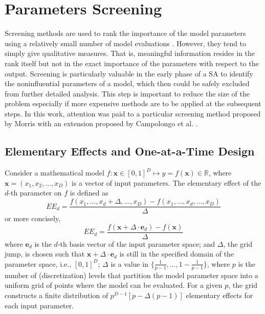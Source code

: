\section{Parameters Screening}\label{sec:sa_parameters_screening}

Screening methods are used to rank the importance of the model parameters using a relatively small number of model evaluations \cite{Saltelli2004}.
However, they tend to simply give qualitative measures.
That is, meaningful information resides in the rank itself but not in the exact importance of the parameters with respect to the output. 
Screening is particularly valuable in the early phase of a SA to identify the noninfluential parameters of a model,
which then could be safely excluded from further detailed analysis. 
This step is important to reduce the size of the problem especially if more expensive methods are to be applied at the subsequent steps. 
In this work, attention was paid to a particular screening method proposed by Morris \cite{Morris1991} with an extension proposed by Campolongo et al. \cite{Campolongo2011}.

\subsection{Elementary Effects and One-at-a-Time Design}\label{sub:sa_ee_oat}

Consider a mathematical model $f: \bm{x} \in [0,1]^D \mapsto y = f(\bm{x}) \in \mathbb{R}$, 
where $\bm{x} = (x_1, x_2, \dots,x_D)$ is a vector of input parameters.
The elementary effect of the $d$-th parameter on $f$ is defined as
\begin{equation}
  EE_d = \frac{f(x_1, \dots, x_d+\Delta,\dots,x_D) - f(x_1, \dots, x_d,\dots,x_D)}{\Delta}
\label{eq:elementary_effect}
\end{equation}
or more concisely,
\begin{equation}
  EE_d = \frac{f(\bm{x} + \Delta \cdot \bm{e}_d) - f(\bm{x})}{\Delta}
\label{eq:elementary_effect_concise}
\end{equation}
where $\bm{e}_d$ is the $d$-th basis vector of the input parameter space;
and $\Delta$, the grid jump, is chosen such that $\mathbf{x} + \Delta \cdot \bm{e}_d$ is still in the specified domain of the parameter space, i.e., $[0,1]^D$; 
$\Delta$ is a value in $\{\frac{1}{p-1}, \dots, 1 - \frac{1}{p-1}\}$, 
where $p$ is the number of (discretization) levels that partition the model parameter space into a uniform grid of points where the model can be evaluated. 
For a given $p$, the grid constructs a finite distribution of $p^{D-1}[p - \Delta(p-1)]$ elementary effects for each input parameter.

